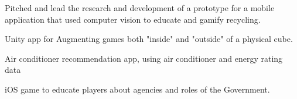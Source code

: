 \documentclass[a4paper]{deedy-resume_twopage} %
\begin{document}
\begin{minipage}[t]{0.66\textwidth}
  \sectionspace %


  Pitched and lead the research and development of a prototype for a mobile application that used computer vision to educate and gamify recycling. %

  \sectionspace %



  Unity app for Augmenting games both "inside" and "outside" of a physical cube. %

  \sectionspace %


  Air conditioner recommendation app, using air conditioner and energy rating data %

  \sectionspace %

  iOS game to educate players about agencies and roles of the Government. %


\end{minipage}
\end{document}
